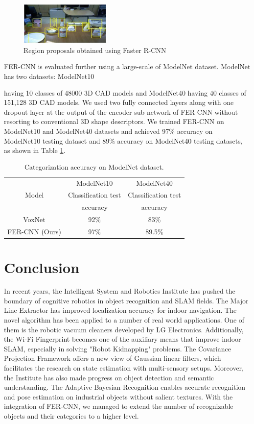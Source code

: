 \documentclass{ieeeaccess}
\begin{document}
\begin{figure}[t!]
\centering
\label{deep_result}
\includegraphics[width=0.4\textwidth]{deep_result.png}
\caption{Region proposals obtained using Faster R-CNN}
\end{figure}

FER-CNN is evaluated further using a large-scale of
ModelNet dataset. ModelNet has two datasets: ModelNet10

having 10 classes of 48000 3D CAD models and ModelNet40
having 40 classes of 151,128 3D CAD models. We used two
fully connected layers along with one dropout layer at the
output of the encoder sub-network of FER-CNN without
resorting to conventional 3D shape descriptors. We trained
FER-CNN on ModelNet10 and ModelNet40 datasets and
achieved 97\% accuracy on ModelNet10 testing dataset and
89\% accuracy on ModelNet40 testing datasets, as shown in
Table \ref{deep_table}.

\begin{table}
\label{deep_table}
\setlength{\tabcolsep}{3pt}
\centering
\begin{tabular}{|c|c|c|}
\hline
 & ModelNet10 & ModelNet40 \\
Model & Classification test & Classification test \\
& accuracy & accuracy \\
\hline
VoxNet & 92\% & 83\% \\
\hline
FER-CNN (Ours) & 97\% & 89.5\% \\
\hline
\end{tabular}
\caption{Categorization accuracy on ModelNet dataset.}
\end{table}

\section{Conclusion}
In recent years, the Intelligent System and Robotics Institute has pushed the boundary of cognitive robotics in object recognition and SLAM fields. The Major Line Extractor has improved localization accuracy for indoor navigation. The novel algorithm has been applied to a number of real world applications. One of them is the robotic vacuum cleaners developed by LG Electronics. Additionally, the Wi-Fi Fingerprint becomes one of the auxiliary means that improve indoor SLAM, especially in solving "Robot Kidnapping" problems. The Covariance Projection Framework offers a new view of Gaussian linear filters, which facilitates the research on state estimation with multi-sensory setups. Moreover, the Institute has also made progress on object detection and semantic understanding. The Adaptive Bayesian Recognition enables accurate recognition and pose estimation on industrial objects without salient textures. With the integration of FER-CNN, we managed to extend the number of recognizable objects and their categories to a higher level.
\end{document}
